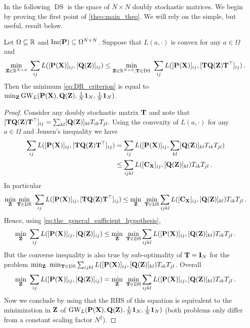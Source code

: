In the following $\operatorname{DS}$ is the space of $N \times N$ doubly stochastic matrices. We begin by proving the first point of \cref{theo:main_theo}. We will rely on the simple, but useful, result below.
\begin{proposition}
	\label{proposition:general_sufficient_condition}
	Let $\Omega \subseteq \mathbb{R}$ and $\operatorname{Im}({\mathbf{P}}) \subseteq \Omega^{N \times N}$. Suppose that $L(a, \cdot)$ is convex for any $a \in \Omega$ and
	\begin{equation}
		\label{eq:the_general_sufficient_hypothesis}
		\min_{\mZ \in \R^{N \times d}} \ \sum_{ij} L([\simiX(\mX)]_{ij}, [\simiZ(\mZ)]_{ij}) \leq \min_{\mZ \in \R^{N \times d}, \mT \in \DS} \ \sum_{ij} L([\simiX(\mX)]_{ij}, [\mT \simiZ(\mZ) \mT^\top]_{ij})\,.
	\end{equation}
	Then the minimum \cref{eq:DR_criterion} is equal to $\min_{{\mathbf{Z}}}\operatorname{GW}_L({\mathbf{P}}({\mathbf{X}}), {\mathbf{Q}}({\mathbf{Z}}), \frac{1}{N}\bm{1}_N, \frac{1}{N}\bm{1}_N)$.
\end{proposition}
\begin{proof}
	Consider any doubly stochastic matrix ${\mathbf{T}}$ and note that $[{\mathbf{T}} {\mathbf{Q}}({\mathbf{Z}}) {\mathbf{T}}^\top]_{ij} = \sum_{kl} [{\mathbf{Q}}({\mathbf{Z}})]_{kl} T_{ik} T_{jl}$. Using the convexity of $L(a, \cdot)$ for any $a \in \Omega$ and Jensen's inequality we have
	\begin{equation}
		\begin{split}
			\label{eq:jensenagain}
			\sum_{ij} L([{\mathbf{P}}({\mathbf{X}})]_{ij}, [{\mathbf{T}} {\mathbf{Q}}({\mathbf{Z}}) {\mathbf{T}}^\top]_{ij}) &= \sum_{ij} L([{\mathbf{P}}({\mathbf{X}})]_{ij}, \sum_{kl} [{\mathbf{Q}}({\mathbf{Z}})]_{kl} T_{ik} T_{jl})\\
			&\leq \sum_{ijkl} L([{\mathbf{C}}_{\mathbf{X}}]_{ij}, [{\mathbf{Q}}({\mathbf{Z}})]_{kl}) T_{ik} T_{jl}\,.
		\end{split}
	\end{equation}
	In particular
	\begin{equation}
		\min_{\mZ} \min_{\mT \in \DS} \ \sum_{ij} L([\simiX(\mX)]_{ij}, [\mT \simiZ(\mZ) \mT^\top]_{ij}) \leq \min_{\mZ} \ \min_{\mT \in \DS} \sum_{ijkl} L([\mC_\mX]_{ij}, [\simiZ(\mZ)]_{kl}) T_{ik} T_{jl} \,.
	\end{equation}
	Hence, using \cref{eq:the_general_sufficient_hypothesis},
	\begin{equation}
		\min_{{\mathbf{Z}}} \ \sum_{ij} L([{\mathbf{P}}({\mathbf{X}})]_{ij}, [{\mathbf{Q}}({\mathbf{Z}})]_{ij}) \leq \min_{{\mathbf{Z}}} \ \min_{{\mathbf{T}} \in \operatorname{DS}} \sum_{ijkl} L([{\mathbf{P}}({\mathbf{X}})]_{ij}, [{\mathbf{Q}}({\mathbf{Z}})]_{kl}) T_{ik} T_{jl}\,.
	\end{equation}
	But the converse inequality is also true by sub-optimality of ${\mathbf{T}} = {\mathbf{I}}_N$ for the problem $\min_{{\mathbf{Z}}} \ \min_{{\mathbf{T}} \in \operatorname{DS}} \sum_{ijkl} L([{\mathbf{P}}({\mathbf{X}})]_{ij}, [{\mathbf{Q}}({\mathbf{Z}})]_{kl}) T_{ik} T_{jl}$. Overall 
	\begin{equation}
		\min_{\mZ} \ \sum_{ij} L([\simiX(\mX)]_{ij}, [\simiZ(\mZ)]_{ij}) = \min_{\mZ} \ \min_{\mT \in \DS} \sum_{ijkl} L([\simiX(\mX)]_{ij}, [\simiZ(\mZ)]_{kl}) T_{ik} T_{jl}\,.
	\end{equation}
	Now we conclude by using that the RHS of this equation is equivalent to the minimization in ${\mathbf{Z}}$ of $\operatorname{GW}_L({\mathbf{P}}({\mathbf{X}}), {\mathbf{Q}}({\mathbf{Z}}), \frac{1}{N}\bm{1}_N, \frac{1}{N}\bm{1}_N)$ (both problems only differ from a constant scaling factor $N^2$).
\end{proof}

